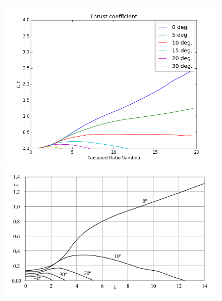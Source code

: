 \documentclass[12pt,t]{beamer}
\begin{document}
\begin{frame}

\begin{figure}[htbp]
        \begin{minipage}{0.4\linewidth}
            \includegraphics[width=\linewidth]{figures/thrust.png}
        \end{minipage}
        \begin{minipage}{0.4\linewidth}
\includegraphics[width=\linewidth]{figures/thrust_coeff_literature.png}
        \end{minipage}
\end{figure}


\end{frame}
\end{document}
